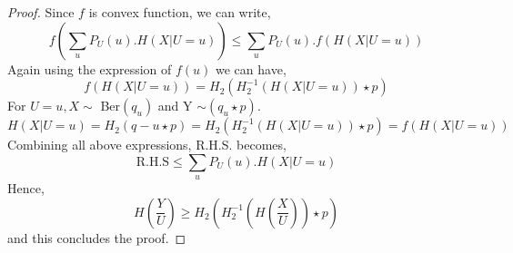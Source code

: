 \documentclass{article}
\begin{document}
\begin{proof}
Since $f$ is convex function, we can write,
\begin{equation}
f \left( \sum_{u} P_{U}(u). H \left( X | U = u\right)\right) \leq   \sum_{u} P_{U}(u). f \left(H \left( X | U = u\right)\right) 
\end{equation}
Again using the expression of $f(u)$ we can have,
\begin{equation}
	f\left(H\left( X|U=u\right)\right) =  H_{2} \left( H_{2}^{-1}\left(H\left( X|U=u\right)\right)\star p\right)
\end{equation}
 For $U = u, X \sim $ Ber$(q_{u})$ and Y $\sim (q_{u} \star p)$.
 \begin{equation}
 H\left( X|U=u\right) = H_{2}\left(q-{u} \star p\right) = H_{2} \left( H_{2}^{-1}\left(H\left( X|U=u\right)\right)\star p\right) = 	f\left(H\left( X|U=u\right)\right)
 \end{equation} 
Combining all above expressions, R.H.S. becomes, 
\begin{equation}
	\text{R.H.S} \leq  \sum_{u} P_{U}(u). H \left( X | U = u\right)
\end{equation}
Hence,
\begin{equation}
	H\left(\frac{Y}{U}\right) \geq H_2\left( H_{2}^{-1}\left( H\left( \frac{X}{U}\right)\right) \star p\right)
\end{equation}
and this concludes the proof.
\end{proof}
\end{document}

